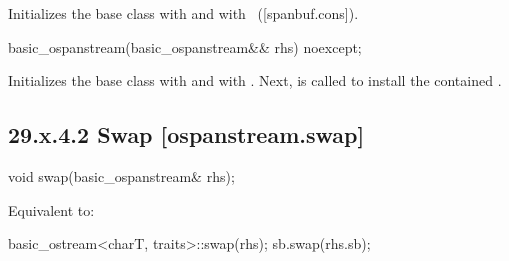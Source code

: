 \documentclass[ebook,11pt,article]{memoir}
\renewcommand{\iref}[1]{[#1]}
\begin{document}
\begin{itemdescr}
\pnum
\effects
Initializes the base class with
and  with
~(\iref{spanbuf.cons}).
\end{itemdescr}

\begin{itemdecl}
basic_ospanstream(basic_ospanstream&& rhs) noexcept;
\end{itemdecl}

\begin{itemdescr}
\pnum
\effects 
Initializes the base class with  
and  with .
Next,  is called to
install the contained .
\end{itemdescr}

\subsection{29.x.4.2 Swap [ospanstream.swap]}
\label{ospanstream.swap}

%

\begin{itemdecl}
void swap(basic_ospanstream& rhs);
\end{itemdecl}

\begin{itemdescr}
\pnum
\effects Equivalent to:
\begin{codeblock}
    basic_ostream<charT, traits>::swap(rhs);
    sb.swap(rhs.sb);
\end{codeblock}
\end{itemdescr}
\end{document}

